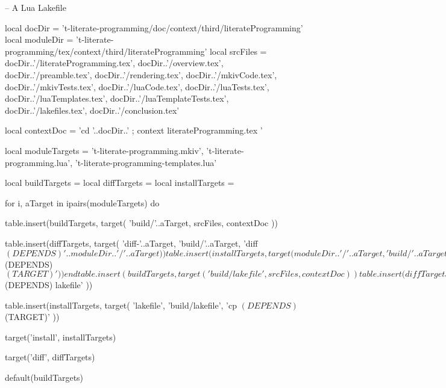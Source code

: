 \startLakefile
-- A Lua Lakefile

local docDir    =
  't-literate-programming/doc/context/third/literateProgramming'
local moduleDir =
  't-literate-programming/tex/context/third/literateProgramming'
local srcFiles = {
  docDir..'/literateProgramming.tex',
  docDir..'/overview.tex',
  docDir..'/preamble.tex',
  docDir..'/rendering.tex',
  docDir..'/mkivCode.tex',
  docDir..'/mkivTests.tex',
  docDir..'/luaCode.tex',
  docDir..'/luaTests.tex',
  docDir..'/luaTemplates.tex',
  docDir..'/luaTemplateTests.tex',
  docDir..'/lakefiles.tex',
  docDir..'/conclusion.tex'
}

local contextDoc = 
  'cd '..docDir..' ; context literateProgramming.tex '

local moduleTargets = {
  't-literate-programming.mkiv',
  't-literate-programming.lua',
  't-literate-programming-templates.lua'
}

local buildTargets   = { }
local diffTargets    = { }
local installTargets = { }

for i, aTarget in ipairs(moduleTargets) do

  table.insert(buildTargets, target(
    'build/'..aTarget,
    srcFiles,
    contextDoc
  ))

  table.insert(diffTargets, target(
    'diff-'..aTarget,
    'build/'..aTarget,
    'diff $(DEPENDS) '..moduleDir..'/'..aTarget
  ))

  table.insert(installTargets, target(
    moduleDir..'/'..aTarget,
    'build/'..aTarget,
    'cp $(DEPENDS) $(TARGET)'
  ))
end

table.insert(buildTargets, target(
  'build/lakefile',
  srcFiles,
  contextDoc
))

table.insert(diffTargets, target(
  'diff-lakefile',
  'build/lakefile',
  'diff $(DEPENDS) lakefile'
))

table.insert(installTargets, target(
  'lakefile',
  'build/lakefile',
  'cp $(DEPENDS) $(TARGET)'
))

target('install', installTargets)

target('diff', diffTargets)

default(buildTargets)

\stopLakefile

\stopchapter